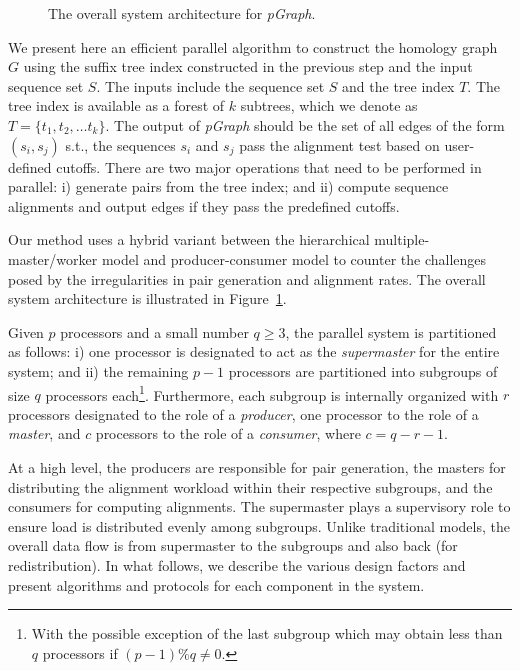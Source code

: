 \documentclass[10pt,journal,letterpaper,compsoc]{IEEEtran}
\begin{document}
\begin{figure}[tb]
\centerline{
						\scalebox{0.8}{}
            }
\caption{
The overall system architecture for {\it pGraph}.
}
\label{figPClust}
\end{figure}

We present here an efficient parallel algorithm to construct the homology graph $G$ using the suffix tree index constructed in the previous step and the input sequence set $S$.  The inputs include the sequence set $S$ and the tree index $T$. The tree index is available as a forest of $k$ subtrees, which we denote as $T=\{t_1,t_2,\ldots t_k\}$.  The output of {\it pGraph} should be the set of all edges of the form $(s_i,s_j)$ s.t., the sequences $s_i$ and $s_j$ pass the alignment test based on user-defined cutoffs. There are two major operations that need to be performed in parallel: i) generate pairs from the tree index; and ii) compute sequence alignments and output edges if they pass the predefined cutoffs.


Our method uses a hybrid variant between the hierarchical multiple-master/worker model and producer-consumer model to counter the challenges posed by the irregularities in pair generation and alignment rates. The overall system architecture is illustrated in Figure~\ref{figPClust}. 

Given $p$ processors and a small number $q\geq 3$, the parallel system is partitioned as follows: i) one processor is designated to act as the \emph{supermaster} for the entire system; and ii) the remaining $p-1$ processors are partitioned into subgroups of size $q$ processors each\footnote{With the possible exception of the last subgroup which may obtain less than $q$ processors if $(p-1)\%q\ne 0$.}. Furthermore, each subgroup is internally organized with $r$ processors designated to the role of a \emph{producer}, one processor to the role of a \emph{master}, and $c$ processors to the role of a \emph{consumer}, where $c=q-r-1$. 

At a high level, the producers are responsible for pair generation, the masters for distributing the alignment workload within their respective subgroups, and the consumers for computing alignments. The supermaster plays a supervisory role to ensure load is distributed evenly among subgroups. Unlike traditional models, the overall data flow is from supermaster to the subgroups and also back (for redistribution). In what follows, we describe the various design factors and present algorithms and protocols for each component in the system. 
\end{document}
